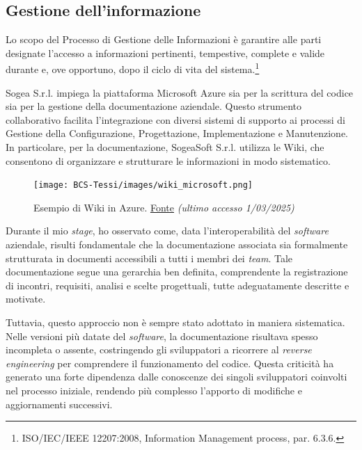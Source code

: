         \subsection{Gestione dell’informazione}

        Lo scopo del Processo di Gestione delle Informazioni è garantire alle parti designate l’accesso a informazioni pertinenti, tempestive, complete e valide durante e, ove opportuno, dopo il ciclo di vita del sistema.\footnote{ISO/IEC/IEEE 12207:2008, Information Management process, par. 6.3.6.}

        \noindent Sogea S.r.l. impiega la piattaforma Microsoft Azure sia per la scrittura del codice sia per la gestione della documentazione aziendale. Questo strumento collaborativo facilita l'integrazione con diversi sistemi di supporto ai processi di Gestione della Configurazione, Progettazione, Implementazione e Manutenzione. In particolare, per la documentazione, SogeaSoft S.r.l. utilizza le Wiki, che consentono di organizzare e strutturare le informazioni in modo sistematico.  

        \begin{figure}[H]
            \centering
            \texttt{[image: BCS-Tessi/images/wiki\_microsoft.png]}
            \caption{Esempio di Wiki in Azure. \href{https://learn.microsoft.com/it-it/azure/devops/project/wiki/wiki-create-repo?view=azure-devopstabs=browser}{Fonte} \textit{(ultimo accesso 1/03/2025)}}
            \label{fig:Wiki}
        \end{figure}

        \noindent Durante il mio \textit{stage}, ho osservato come, data l’interoperabilità del \textit{software} aziendale, risulti fondamentale che la documentazione associata sia formalmente strutturata in documenti accessibili a tutti i membri dei \textit{team}. Tale documentazione segue una gerarchia ben definita, comprendente la registrazione di incontri, requisiti, analisi e scelte progettuali, tutte adeguatamente descritte e motivate.  

        \noindent Tuttavia, questo approccio non è sempre stato adottato in maniera sistematica. Nelle versioni più datate del \textit{software}, la documentazione risultava spesso incompleta o assente, costringendo gli sviluppatori a ricorrere al \textit{reverse engineering} per comprendere il funzionamento del codice. Questa criticità ha generato una forte dipendenza dalle conoscenze dei singoli sviluppatori coinvolti nel processo iniziale, rendendo più complesso l’apporto di modifiche e aggiornamenti successivi.  

